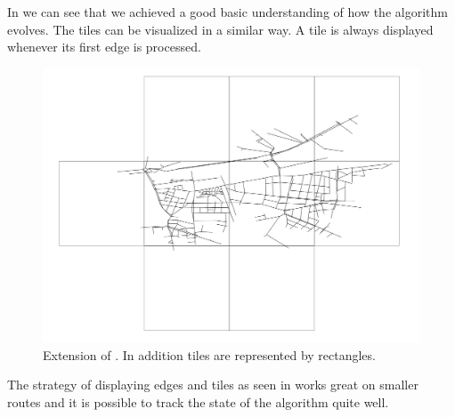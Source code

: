 \documentclass
[
    paper = a4,
    pagesize,
    12 pt,
    oneside,                       %
    open = right,
    DIV = calc,
    BCOR = 0 mm,                   %
    bibtotoc
]
{scrbook}
\begin{document}
In  we can see that we achieved a good basic understanding of how the algorithm evolves.
The tiles can be visualized in a similar way.
A tile is always displayed whenever its first edge is processed.

\begin{figure}
    \includegraphics[width=\textwidth]{Images/vis-rectangular-tiles-small.png}
\caption[]{Extension of . In addition tiles are represented by rectangles.}
\label{fig:rectangle_tiles}
\end{figure}

The strategy of displaying edges and tiles as seen in   works great on smaller routes and it is possible to track the state of the algorithm quite well.
\end{document}

